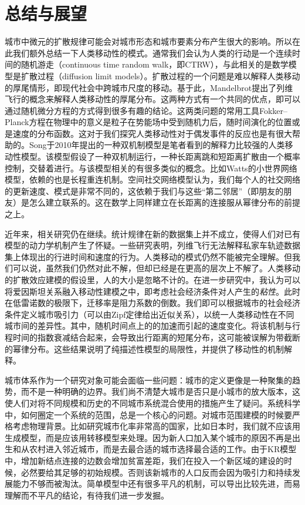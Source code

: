 \chapter{总结与展望}

城市中微元的扩散规律可能会对城市形态和城市要素分布产生很大的影响。所以在此我们额外总结一下人类移动性的模式。通常我们会认为人类的行动是一个连续时间的随机游走（continuous time random walk，即CTRW），与此相关的是数学模型是扩散过程（diffusion limit models）。扩散过程的一个问题是难以解释人类移动的厚尾情形，即现代社会中跨城市尺度的移动。基于此，Mandelbrot提出了列维飞行的概念\cite{doi:10.1142/S0218127408021877}来解释人类移动性的厚尾分布。这两种方式有一个共同的优点，即可以通过随机微分方程的方式得到很多有趣的结论。这两类问题的常用工具Fokker–Planck方程在物理中的意义是粒子在势能场中受到随机力后，随时间演化的位置或是速度的分布函数。这对于我们探究人类移动性对于偶发事件的反应也是有很大帮助的。Song于2010年提出的一种双机制模型\cite{song2010modelling}是笔者看到的解释力比较强的人类移动性模型。该模型假设了一种双机制运行，一种长距离跳和短距离扩散由一个概率控制，交替着进行。与该模型相关的有很多类似的概念。比如Watts的小世界网络模型\cite{watts1998collective}，依赖的也是长程重连机制。空间社交网络模型\cite{PhysRevX.4.011008}认为，我们每个人的社交网络的更新速度、模式是非常不同的，这依赖于我们与这些“第二邻居”（即朋友的朋友）是怎么建立联系的。这在数学上同样建立在长距离的连接服从幂律分布的前提之上。

近年来，相关研究仍在继续。统计规律在新的数据集上并不成立，使得人们对已有模型的动力学机制产生了怀疑。一些研究\cite{GallottiA}表明，列维飞行无法解释私家车轨迹数据集上体现出的行进时间和速度的行为。人类移动的模式仍然不能被完全理解。但我们可以说，虽然我们仍然对此不解，但却已经是在更高的层次上不解了。人类移动的扩散效应建模的假设里，人的大小是忽略不计的。在进一步研究中，我认为可以将爱因斯坦关系\cite{doi:10.1002/andp.18551700105}融入移动性建模之中，即考虑社会经济条件对人产生的\emph{粘性}。此时在低雷诺数的极限下，迁移率是阻力系数的倒数。我们即可以根据城市的社会经济条件定义城市吸引力（可以由Zipf定律给出近似关系），以统一人类移动性在不同城市间的差异性。其中，随机时间点上的的加速而引起的速度变化。将该机制与行程时间的指数衰减结合起来，会导致出行距离的短尾分布，这可能被误解为带截断的幂律分布。这些结果说明了纯描述性模型的局限性，并提供了移动性的机制解释。

城市体系作为一个研究对象可能会面临一些问题：城市的定义更像是一种聚集的趋势，而不是一种明确的边界。我们尚不清楚大城市是否只是小城市的放大版本，这使人们对将不同规模和历史的不同城市系统混合使用的措施产生了疑问\cite{Depersin2317}。系统科学中，如何圈定一个系统的范围，总是一个核心的问题。对城市范围建模的时候要严格考虑物理背景。比如研究城市化率非常高的国家，比如日本时，我们就不应该用生成模型，而是应该用转移模型来处理。因为新人口加入某个城市的原因不再是出生和从农村进入邻近城市，而是去最合适的城市选择最合适的工作。由于KR模型中，增加新结点连接的边数会增加贫富差距，我们在投入一个新区域的建设的时候，必然要给其足够的初始规模。否则该新城市的人口反而会因为吸引力和持续发展能力不够而被淘汰。简单模型中还有很多平凡的机制，可以导出比较先进，而易理解而不平凡的结论，有待我们进一步发掘。

